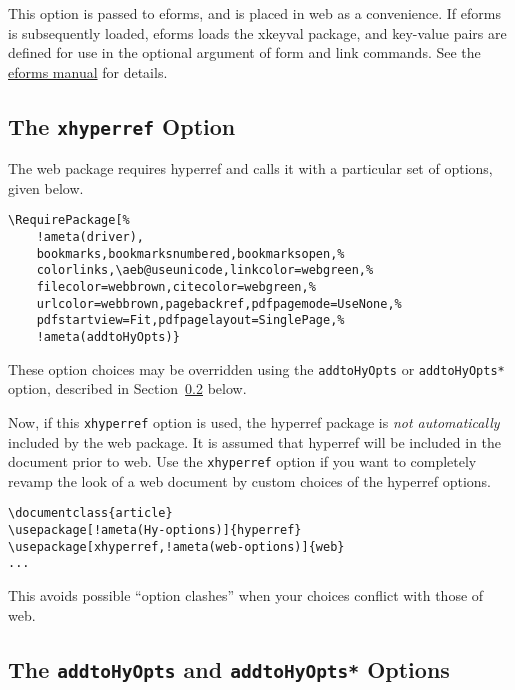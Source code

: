 \documentclass{article}
\def\Web{\textsf{web}}
\let\pkg\textsf
\let\opt\texttt
\edef\amtIndent{\the\parindent}
\begin{document}
{This option is passed to \textsf{eforms}, and is placed in {\Web} as
a convenience. If \textsf{eforms} is subsequently loaded,
\textsf{eforms} loads the \textsf{xkeyval} package, and key-value pairs are
defined for use in the optional argument of form and link commands.
See the \href{eformman.pdf}{eforms manual} for details.

\subsection{The \texttt{xhyperref} Option}\label{web:xhyperref}

The \pkg{web} package requires \pkg{hyperref} and calls it with a particular
set of options, given below.
\begin{Verbatim}[xleftmargin=\amtIndent,commandchars=!()]
\RequirePackage[%
    !ameta(driver),
    bookmarks,bookmarksnumbered,bookmarksopen,%
    colorlinks,\aeb@useunicode,linkcolor=webgreen,%
    filecolor=webbrown,citecolor=webgreen,%
    urlcolor=webbrown,pagebackref,pdfpagemode=UseNone,%
    pdfstartview=Fit,pdfpagelayout=SinglePage,%
    !ameta(addtoHyOpts)}
\end{Verbatim}
These option choices may be overridden using the \opt{addtoHyOpts} or
\opt{addtoHyOpts*} option, described in Section~\ref*{web:addtoHyOpts} below.

Now, if this \opt{xhyperref} option is used, the \pkg{hyperref} package is
\emph{not automatically} included by the \pkg{web} package. It is assumed
that \pkg{hyperref} will be included in the document prior to \pkg{web}. Use
the \opt{xhyperref} option if you want to completely revamp the look of a
\pkg{web} document by custom choices of the \pkg{hyperref} options.
\begin{Verbatim}[xleftmargin=\amtIndent,commandchars=!()]
\documentclass{article}
\usepackage[!ameta(Hy-options)]{hyperref}
\usepackage[xhyperref,!ameta(web-options)]{web}
...
\end{Verbatim}
This avoids possible ``option clashes'' when your choices conflict with those of \pkg{web}.


\subsection{The \texttt{addtoHyOpts} and \texttt{addtoHyOpts*} Options}\label{web:addtoHyOpts}

}
\end{document}
